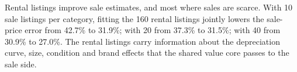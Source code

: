 Rental listings improve sale estimates, and most where sales are scarce. With 10 sale listings per
category, fitting the 160 rental listings jointly lowers the sale-price error from 42.7\% to 31.9\%;
with 20 from 37.3\% to 31.5\%; with 40 from 30.9\% to 27.0\%. The rental listings carry information
about the depreciation curve, size, condition and brand effects that the shared value core passes
to the sale side.
